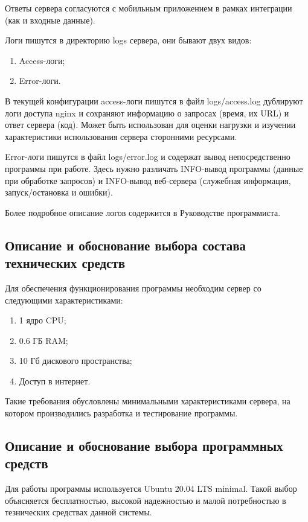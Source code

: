 \documentclass[explnote]{espd}
\begin{document}
Ответы сервера согласуются с мобильным приложением в рамках интеграции (как и входные данные).

Логи пишутся в директорию logs сервера, они бывают двух видов:

\begin{enumerate}
\item Access-логи;
\item Error-логи.
\end{enumerate}

В текущей конфигурации access-логи пишутся в файл logs/access.log дублируют логи доступа nginx и сохраняют информацию о запросах (время, их URL) и ответ сервера (код). Может быть использован для оценки нагрузки и изучении характеристики использования сервера сторонними ресурсами.

Error-логи пишутся в файл logs/error.log и содержат вывод непосредственно программы при работе. Здесь нужно различать INFO-вывод программы (данные при обработке запросов) и INFO-вывод веб-сервера (служебная информация, запуск/остановка и ошибки).

Более подробное описание логов содержится в Руководстве программиста.

\subsection{Описание и обоснование выбора состава технических средств}
Для обеспечения функционирования программы необходим сервер со следующими характеристиками:

\begin{enumerate}
\item 1 ядро CPU;
\item 0.6 ГБ RAM;
\item 10 Гб дискового пространства;
\item Доступ в интернет.
\end{enumerate}

Такие требования обусловлены минимальными характеристиками сервера, на котором производились разработка и тестирование программы.

\subsection{Описание и обоснование выбора программных средств}
Для работы программы используется Ubuntu 20.04 LTS minimal. Такой выбор объясняется бесплатностью, высокой надежностью и малой потребностью в тезнических средствах данной системы.
\end{document}
